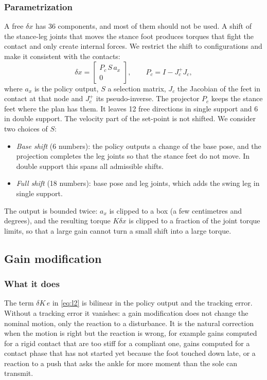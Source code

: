 \documentclass[conference]{IEEEtran}
\begin{document}
\subsubsection{Parametrization}
A free $\delta x$ has 36 components, and most of them should not be used.
A shift of the stance-leg joints that moves the stance foot produces torques that fight the contact and only create internal forces.
We restrict the shift to configurations and make it consistent with the contacts:
\begin{equation}
\delta x=\begin{bmatrix}P_c\,S\,a_x\\ 0\end{bmatrix},\qquad P_c=I-J_c^{+}J_c ,
\label{eq:setpoint}
\end{equation}
where $a_x$ is the policy output, $S$ a selection matrix, $J_c$ the Jacobian of the feet in contact at that node and $J_c^{+}$ its pseudo-inverse.
The projector $P_c$ keeps the stance feet where the plan has them.
It leaves 12 free directions in single support and 6 in double support.
The velocity part of the set-point is not shifted.
We consider two choices of $S$:
\begin{itemize}
\item \emph{Base shift} (6 numbers): the policy outputs a change of the base pose, and the projection completes the leg joints so that the stance feet do not move. In double support this spans all admissible shifts.
\item \emph{Full shift} (18 numbers): base pose and leg joints, which adds the swing leg in single support.
\end{itemize}
The output is bounded twice: $a_x$ is clipped to a box (a few centimetres and degrees), and the resulting torque $K\delta x$ is clipped to a fraction of the joint torque limits, so that a large gain cannot turn a small shift into a large torque.

\subsection{Gain modification}
\subsubsection{What it does}
The term $\delta K\,e$ in \eqref{eq:l2} is bilinear in the policy output and the tracking error.
Without a tracking error it vanishes: a gain modification does not change the nominal motion, only the reaction to a disturbance.
It is the natural correction when the motion is right but the reaction is wrong, for example gains computed for a rigid contact that are too stiff for a compliant one, gains computed for a contact phase that has not started yet because the foot touched down late, or a reaction to a push that asks the ankle for more moment than the sole can transmit.
\end{document}
